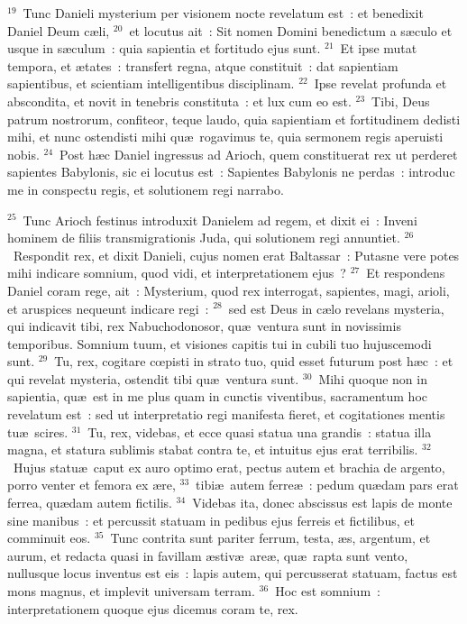 ${}^{19}$~Tunc Danieli mysterium per visionem nocte revelatum est~: et benedixit Daniel Deum c\ae li,
${}^{20}$~et locutus ait~: Sit nomen Domini benedictum a s\ae culo et usque in s\ae culum~: quia sapientia et fortitudo ejus sunt.
${}^{21}$~Et ipse mutat tempora, et \ae tates~: transfert regna, atque constituit~: dat sapientiam sapientibus, et scientiam intelligentibus disciplinam.
${}^{22}$~Ipse revelat profunda et abscondita, et novit in tenebris constituta~: et lux cum eo est.
${}^{23}$~Tibi, Deus patrum nostrorum, confiteor, teque laudo, quia sapientiam et fortitudinem dedisti mihi, et nunc ostendisti mihi qu\ae\ rogavimus te, quia sermonem regis aperuisti nobis.
${}^{24}$~Post h\ae c Daniel ingressus ad Arioch, quem constituerat rex ut perderet sapientes Babylonis, sic ei locutus est~: Sapientes Babylonis ne perdas~: introduc me in conspectu regis, et solutionem regi narrabo.


${}^{25}$~Tunc Arioch festinus introduxit Danielem ad regem, et dixit ei~: Inveni hominem de filiis transmigrationis Juda, qui solutionem regi annuntiet.
${}^{26}$~Respondit rex, et dixit Danieli, cujus nomen erat Baltassar~: Putasne vere potes mihi indicare somnium, quod vidi, et interpretationem ejus~?
${}^{27}$~Et respondens Daniel coram rege, ait~: Mysterium, quod rex interrogat, sapientes, magi, arioli, et aruspices nequeunt indicare regi~:
${}^{28}$~sed est Deus in c\ae lo revelans mysteria, qui indicavit tibi, rex Nabuchodonosor, qu\ae\ ventura sunt in novissimis temporibus. Somnium tuum, et visiones capitis tui in cubili tuo hujuscemodi sunt.
${}^{29}$~Tu, rex, cogitare cœpisti in strato tuo, quid esset futurum post h\ae c~: et qui revelat mysteria, ostendit tibi qu\ae\ ventura sunt.
${}^{30}$~Mihi quoque non in sapientia, qu\ae\ est in me plus quam in cunctis viventibus, sacramentum hoc revelatum est~: sed ut interpretatio regi manifesta fieret, et cogitationes mentis tu\ae\ scires.
${}^{31}$~Tu, rex, videbas, et ecce quasi statua una grandis~: statua illa magna, et statura sublimis stabat contra te, et intuitus ejus erat terribilis.
${}^{32}$~Hujus statu\ae\ caput ex auro optimo erat, pectus autem et brachia de argento, porro venter et femora ex \ae re,
${}^{33}$~tibi\ae\ autem ferre\ae~: pedum qu\ae dam pars erat ferrea, qu\ae dam autem fictilis.
${}^{34}$~Videbas ita, donec abscissus est lapis de monte sine manibus~: et percussit statuam in pedibus ejus ferreis et fictilibus, et comminuit eos.
${}^{35}$~Tunc contrita sunt pariter ferrum, testa, \ae s, argentum, et aurum, et redacta quasi in favillam \ae stiv\ae\ are\ae , qu\ae\ rapta sunt vento, nullusque locus inventus est eis~: lapis autem, qui percusserat statuam, factus est mons magnus, et implevit universam terram.
${}^{36}$~Hoc est somnium~: interpretationem quoque ejus dicemus coram te, rex.


